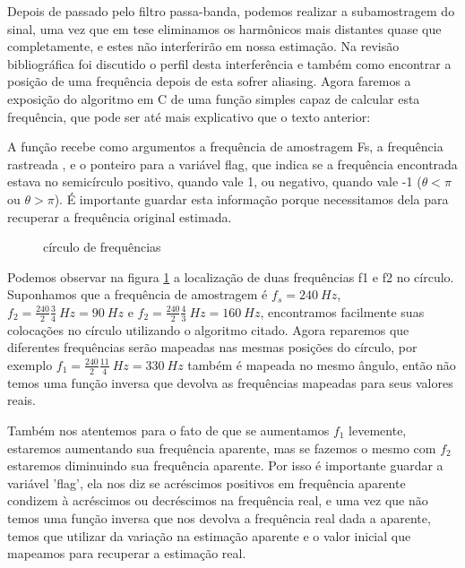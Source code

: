 \documentclass[a4paper, 12pt]{book}
\begin{document}
Depois de passado pelo filtro passa-banda, podemos realizar a subamostragem do sinal, uma vez que em tese eliminamos os harmônicos mais distantes quase que completamente, e estes não interferirão em nossa estimação. Na revisão bibliográfica foi discutido o perfil desta interferência e também como encontrar a posição de uma frequência depois de esta sofrer aliasing. Agora faremos a exposição do algoritmo em C de uma função simples capaz de calcular esta frequência, que pode ser até mais explicativo que o texto anterior:



A função recebe como argumentos a frequência de amostragem Fs, a frequência rastreada , e o ponteiro para a variável flag, que indica se a frequência encontrada estava no semicírculo positivo, quando vale 1, ou negativo, quando vale -1 ($\theta<\pi$ ou $\theta>\pi$). É importante guardar esta informação porque necessitamos dela para recuperar a frequência original estimada. 

\begin{figure}[h]
	\centering    
	\def\svgwidth{\columnwidth}
	
	\caption{círculo de frequências}
	\label{fig:freq_circ}
\end{figure}

\indent Podemos observar na figura \ref{fig:freq_circ} a localização de duas frequências f1 e f2 no círculo. Suponhamos que a frequência de amostragem é $f_s=240 \:Hz$, $f_2=\frac{240}{2} \frac{3}{4} \: Hz = 90 \: Hz$ e $f_2=\frac{240}{2} \frac{4}{3} \: Hz = 160 \: Hz$, encontramos facilmente suas colocações no círculo utilizando o algoritmo citado. Agora reparemos que diferentes frequências serão mapeadas nas mesmas posições do círculo, por exemplo $f_1=\frac{240}{2} \frac{11}{4} \: Hz = 330 \: Hz$ também é mapeada no mesmo ângulo, então não temos uma função inversa que devolva as frequências mapeadas para seus valores reais. 

\indent Também nos atentemos para o fato de que se aumentamos $f_1$ levemente, estaremos aumentando sua frequência aparente, mas se fazemos o mesmo com $f_2$ estaremos diminuindo sua frequência aparente. Por isso é importante guardar a variável 'flag', ela nos diz se acréscimos positivos em frequência aparente condizem à acréscimos ou decréscimos na frequência real, e uma vez que não temos uma função inversa que nos devolva a frequência real dada a aparente, temos que utilizar da variação na estimação aparente e o valor inicial que mapeamos para recuperar a estimação real.
\end{document}
